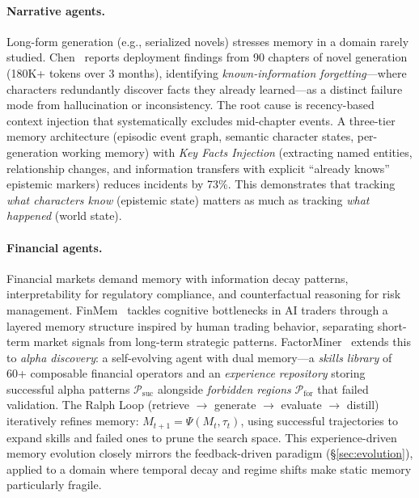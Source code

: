 \documentclass[hf]{ceurart}
\begin{document}
\paragraph{Narrative agents.}
Long-form generation (e.g., serialized novels) stresses memory in
a domain rarely studied. Chen~\cite{epistemicfailures2026} reports
deployment findings from 90 chapters of novel generation (180K+
tokens over 3 months), identifying \emph{known-information
forgetting}---where characters redundantly discover facts they
already learned---as a distinct failure mode from hallucination
or inconsistency. The root cause is recency-based context injection
that systematically excludes mid-chapter events. A three-tier
memory architecture (episodic event graph, semantic character
states, per-generation working memory) with \emph{Key Facts
Injection} (extracting named entities, relationship changes, and
information transfers with explicit ``already knows'' epistemic
markers) reduces incidents by 73\%. This demonstrates that tracking
\emph{what characters know} (epistemic state) matters as much as
tracking \emph{what happened} (world state).

\paragraph{Financial agents.}
Financial markets demand memory with information decay patterns,
interpretability for regulatory compliance, and counterfactual
reasoning for risk management. FinMem~\cite{finmem2025} tackles
cognitive bottlenecks in AI traders through a layered memory
structure inspired by human trading behavior, separating short-term
market signals from long-term strategic patterns.
FactorMiner~\cite{factorminer2026} extends this to
\emph{alpha discovery}: a self-evolving agent with dual memory---a
\emph{skills library} of 60+ composable financial operators and an
\emph{experience repository} storing successful alpha patterns
$\mathcal{P}_{\text{suc}}$ alongside \emph{forbidden regions}
$\mathcal{P}_{\text{for}}$ that failed validation. The Ralph Loop
(retrieve $\to$ generate $\to$ evaluate $\to$ distill) iteratively
refines memory: $M_{t+1} = \Psi(M_t, \tau_t)$, using successful
trajectories to expand skills and failed ones to prune the search
space. This experience-driven memory evolution closely mirrors the
feedback-driven paradigm (\S\ref{sec:evolution}), applied to a
domain where temporal decay and regime shifts make static memory
particularly fragile.
\end{document}

